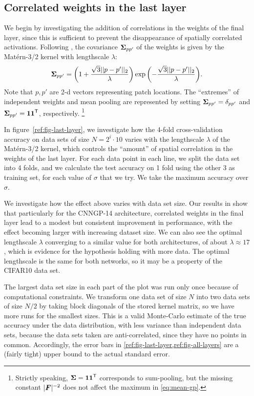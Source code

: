 \documentclass[accepted]{uai2021} %
\newcommand{\layersizebase}{\vF}
\newcommand{\0}{\boldsymbol{0}}
\newcommand{\1}{\boldsymbol{1}}
\begin{document}
\subsection{Correlated weights in the last layer}
We begin by investigating the addition of correlations in the weights of the final layer, since this is sufficient to prevent the disappearance of spatially correlated activations.  Following \citet{dutordoir2020}, the covariance ${\boldsymbol\Sigma}_{pp'}$ of the weights is given by the Matérn-3/2 kernel with lengthscale $\lambda$:
\begin{equation}
    {\boldsymbol\Sigma}_{pp'} = {\left( 1 + \frac{\sqrt{3}||p - p'||_2}{\lambda} \right)} \exp{\left( -\frac{\sqrt{3}||p - p'||_2}{\lambda} \right)}.
\end{equation}
Note that $p,p'$ are 2-d vectors representing patch locations. The ``extremes'' of independent weights and mean pooling are represented by setting ${\boldsymbol\Sigma}_{pp'} = \delta_{pp'}$ and ${\boldsymbol\Sigma}_{pp'} = {\boldsymbol 1\boldsymbol 1}^{\mathsf{T}}$, respectively. \footnote{Strictly speaking, ${\bm{\Sigma}} = {\boldsymbol 1\boldsymbol 1}^{\mathsf{T}}$ corresponds to sum-pooling, but the missing constant $\absshort{\layersizebase}^{-2}$ does not affect the maximum in \cref{eq:mean-gp}.}

In figure~\ref{ref:fig-last-layer}, we investigate how the 4-fold cross-validation accuracy on data sets of size $N=2^i \cdot 10$ varies with the lengthscale $\lambda$ of the Matérn-3/2 kernel, which controls the ``amount'' of spatial correlation in the weights of the last layer. For each data point in each line, we split the data set into 4 folds, and we calculate the test accuracy on 1 fold using the other 3 as training set, for each value of $\sigma$ that we try. We take the maximum accuracy over $\sigma$.

We investigate how the effect above varies with data set size. Our results in  show that particularly for the CNNGP-14 architecture, correlated weights in the final layer lead to a modest but consistent improvement in performance, with the effect becoming larger with increasing dataset size. We can also see the optimal lengthscale $\lambda$  converging to a similar value for both architectures, of about $\lambda \approx 17$, which is evidence for the hypothesis holding with more data. The optimal lengthscale is the same for both networks, so it may be a property of the CIFAR10 data set.

The largest data set size in each part of the plot was run only once because of computational constraints. We transform one data set of size $N$ into two data sets of size $N/2$ by taking block diagonals of the stored kernel matrix, so we have more runs for the smallest sizes. This is a valid Monte-Carlo estimate of the true accuracy under the data distribution, with less variance than independent data sets, because the data sets taken are anti-correlated, since they have no points in common. Accordingly, the error bars in \cref{ref:fig-last-layer,ref:fig-all-layers} are a (fairly tight) upper bound to the actual standard error.
\end{document}
